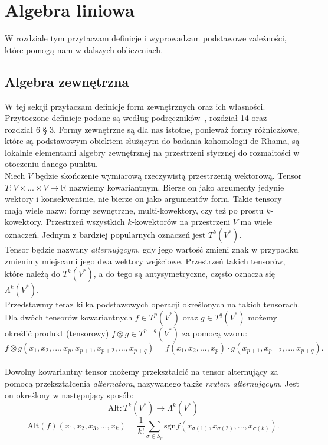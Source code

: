 \documentclass[licencjacka]{pracamgr}
\theoremstyle{definition}
\theoremstyle{definition}
\theoremstyle{plain}
\theoremstyle{plain}
\theoremstyle{plain}
\theoremstyle{plain}
\begin{document}
\chapter{Algebra liniowa}
W rozdziale tym przytaczam definicje i wyprowadzam podstawowe zależności, które
pomogą nam w dalszych obliczeniach. \\

\section{Algebra zewnętrzna}\label{exterior-algebra-chapter}
W tej sekcji przytaczam definicje form zewnętrznych oraz ich własności. 
 Przytoczone
definicje podane są według podręczników~\cite{lee}, rozdział 14 oraz
~\cite{kostrikin} - rozdział 6 § 3. 
Formy zewnętrzne są dla nas istotne, ponieważ formy różniczkowe, które 
są podstawowym obiektem służącym do badania kohomologii de Rhama, 
są lokalnie elementami algebry zewnętrznej na przestrzeni stycznej
do rozmaitości w otoczeniu danego punktu. \\

Niech $V$ będzie skończenie wymiarową rzeczywistą przestrzenią wektorową.
Tensor $T:V \times ... \times V \rightarrow \mathbb{R}$ nazwiemy kowariantnym.
Bierze on jako argumenty jedynie wektory i konsekwentnie, nie bierze on jako
argumentów form.  Takie tensory mają wiele nazw: formy zewnętrzne,
multi-kowektory, czy też po prostu $k$-kowektory.  Przestrzeń wszystkich
$k$-kowektorów na przestrzeni $V$ ma wiele oznaczeń.  Jednym z bardziej
popularnych oznaczeń jest $T^k (V^\ast)$. \\

Tensor będzie nazwany \emph{alternującym}, gdy jego wartość zmieni znak w
przypadku zmienimy miejscami jego dwa wektory wejściowe.  Przestrzeń takich
tensorów, które należą do $T^k (V^\ast)$, a do tego są antysymetryczne, często
oznacza się $\Lambda^k (V^\ast)$. \\

Przedstawmy teraz kilka podstawowych operacji określonych na takich tensorach.
Dla dwóch tensorów kowariantnych $f \in T^p(V^\ast) $ oraz $g \in T^q(V^\ast) $
możemy określić produkt (tensorowy) $f \otimes g \in T^{p+q}(V^\ast) $ za
pomocą wzoru:
\[
  f \otimes g(x_1, x_2, ..., x_p, x_{p+1}, x_{p+2}, ... ,x_{p+q}) =
  f(x_1, x_2, ... , x_p) \cdot g(x_{p+1}, x_{p+2}, ... , x_{p+q}).
\] \\

Dowolny kowariantny tensor możemy
przekształcić na tensor alternujący za pomocą przekształcenia
\emph{alternatora}, nazywanego także \emph{rzutem alternującym}.
Jest on określony w następujący sposób:
\[
\text{Alt}:T^k (V^\ast) \rightarrow  \Lambda^k (V^\ast)
\]
\[
\text{Alt}(f)(x_1, x_2, x_3, ..., x_k) = \frac{1}{k!}
  \sum_{\sigma \in S_p}
     \text{sgn} f(x_{\sigma(1)}, x_{\sigma(2)}, ..., x_{\sigma(k)}).
\] \\
\end{document}
